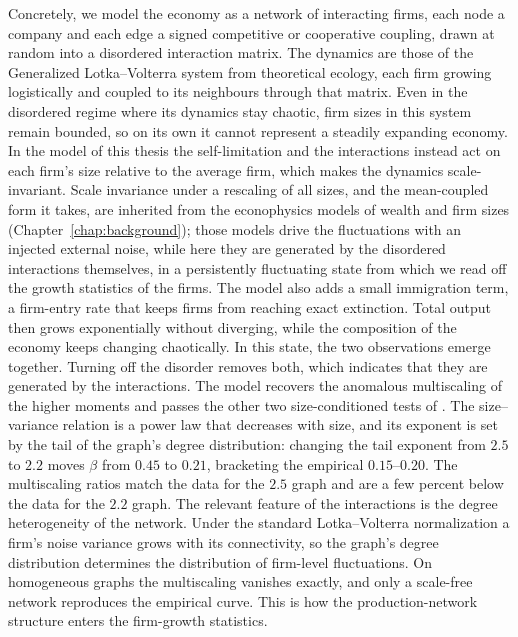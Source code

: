 Concretely, we model the economy as a network of interacting firms, each node a company and
each edge a signed competitive or cooperative coupling, drawn at random into a disordered
interaction matrix. The dynamics are those of the Generalized Lotka--Volterra system from
theoretical ecology, each firm growing logistically and coupled to its neighbours through that
matrix. Even in the disordered regime where its dynamics stay
chaotic, firm sizes in this system remain bounded, so on its own it cannot represent a steadily
expanding economy. In the model of this thesis the self-limitation and the
interactions instead act on each firm's size relative to the average firm,
which makes the dynamics scale-invariant. Scale invariance under a rescaling of all sizes,
and the mean-coupled form it takes, are inherited from the econophysics models of wealth and
firm sizes (Chapter~\ref{chap:background}); those models drive the fluctuations with an
injected external noise, while here they are generated by the disordered
interactions themselves, in a persistently fluctuating state from which we read off the growth
statistics of the firms. The model also adds a small immigration term, a
firm-entry rate that keeps firms from reaching exact extinction.
Total output then grows exponentially without diverging, while the composition of the economy
keeps changing chaotically. In this state, the two observations emerge together. Turning off
the disorder removes both, which indicates that they are generated by the interactions. The
model recovers the anomalous multiscaling of the higher moments and passes the other two
size-conditioned tests of \citet{moran2024}. The size--variance relation is a power law that
decreases with size, and its exponent is set by the tail of the graph's degree distribution:
changing the tail exponent from $2.5$ to $2.2$ moves $\beta$ from $0.45$ to $0.21$, bracketing
the empirical $0.15$--$0.20$. The multiscaling ratios match the data for the $2.5$ graph and
are a few percent below the data for the $2.2$ graph.
The relevant feature of the interactions is the
degree heterogeneity of the network. Under the standard Lotka--Volterra normalization a
firm's noise variance grows with its connectivity, so the graph's degree distribution determines
the distribution of firm-level fluctuations. On homogeneous graphs the multiscaling vanishes
exactly, and only a scale-free network reproduces the empirical curve. This is how the
production-network structure enters the firm-growth statistics.

